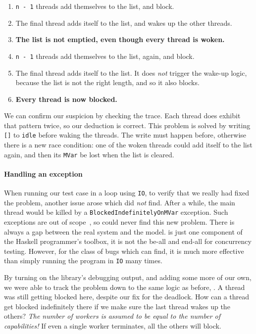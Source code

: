 \begin{enumerate}
\item \verb|n - 1| threads add themselves to the list, and block.
\item The final thread adds itself to the list, and wakes up the other
  threads.
\item \textbf{The list is not emptied, even though every thread is woken.}
\item \verb|n - 1| threads add themselves to the list, again, and
  block.
\item The final thread adds itself to the list.  It does \emph{not}
  trigger the wake-up logic, because the list is not the right length,
  and so it also blocks.
\item \textbf{Every thread is now blocked.}
\end{enumerate}

We can confirm our suspicion by checking the trace.  Each thread does
exhibit that pattern twice, so our deduction is correct.  This problem
is solved by writing \verb|[]| to \verb|idle| before waking the
threads.  The write must happen before, otherwise there is a new race
condition: one of the woken threads could add itself to the list
again, and then its \verb|MVar| be lost when the list is cleared.

\paragraph{Handling an exception}
When running our test case in a loop using \verb|IO|, to verify that
we really had fixed the problem, another issue arose which \dejafu{}
did \emph{not} find.  After a while, the main thread would be killed
by a \verb|BlockedIndefinitelyOnMVar| exception.  Such exceptions are
out of scope~, so \dejafu{} could never find
this new problem.  There is always a gap between the real system and
the model.  \dejafu{} is just one component of the Haskell
programmer's toolbox, it is not the be-all and end-all for concurrency
testing.  However, for the class of bugs which \dejafu{} can find, it
is much more effective than simply running the program in \verb|IO|
many times.

By turning on the library's debugging output, and adding some more of
our own, we were able to track the problem down to the same logic as
before, .  A thread was still getting
blocked here, despite our fix for the deadlock.  How can a thread get
blocked indefinitely there if we make sure the last thread wakes up
the others?  \emph{The number of workers is assumed to be equal to the
  number of capabilities!}  If even a single worker terminates, all
the others will block.

